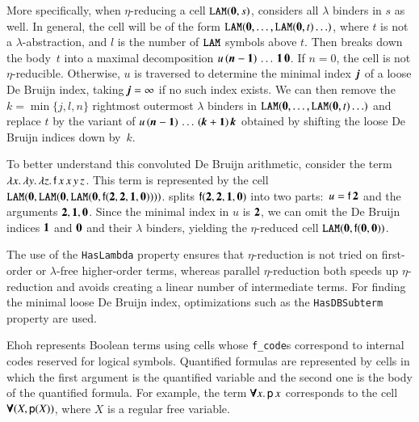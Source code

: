 More specifically, when $\eta$-reducing a cell $\texttt{LAM}(\mathbf{0}, s)$,
\ehohii{} considers all $\lambda$ binders in $s$ as well. In general,
the cell will be of the form
$\texttt{LAM}(\mathbf{0}, \dotsc,\allowbreak \texttt{LAM}(\mathbf{0}, t) \ldots)$,
where $t$ is not a
$\lambda$-abstraction, and $l$ is the number of $\texttt{LAM}$ symbols above $t$. Then \ehohii{} breaks down the body~$t$ into a maximal
decomposition $u\, (\textbf{\textit{n}}\mathbf{{}-1}) \, \ldots \, \mathbf{1} \, \mathbf{0}$.
If $n = 0$, the cell is not $\eta$-reducible.
Otherwise, $u$ is traversed to determine the
minimal index~$\textbf{\textit{j}}$ of a loose De Bruijn index,
taking $\textbf{\textit{j}} = \infty$ if no such index exists.
We can then remove the $k = \min\{j,l,n\}$ rightmost outermost $\lambda$ binders in $\texttt{LAM}(\mathbf{0},
\ldots, \texttt{LAM}(\mathbf{0}, t) \ldots)$ and replace %
$t$ by the variant of
$u \allowbreak\, (\textbf{\textit{n}}\mathbf{{}-1}) \allowbreak\, \ldots \, (\textbf{\textit{k}}\mathbf{{}+1}) \, \textbf{\textit{k}}$
obtained by shifting the loose De Bruijn indices down by~$k$.

To better understand this convoluted De Bruijn arithmetic, consider the
term $\lambda x. \, \lambda y. \, \lambda z.\,\allowbreak \mathsf{f} \, x \, x \, y
\, z$. This term is represented by the cell $\texttt{LAM}(\mathbf{0},
\texttt{LAM}(\mathbf{0}, \texttt{LAM}(\mathbf{0},\allowbreak \mathsf{f}(\mathbf{2}, \mathbf{2}, \mathbf{1},
\mathbf{0}))))$. \ehohii{} splits $\mathsf{f}(\mathbf{2}, \mathbf{2}, \mathbf{1}, \mathbf{0})$ into
two parts:\ $u = \mathsf{f} \, \mathbf{2}$ and the arguments $\mathbf{2}, \mathbf{1},
\mathbf{0}$. Since the minimal index in $u$ is $\mathbf{2}$, we can
omit the De Bruijn indices $\mathbf{1}$ and $\mathbf{0}$ and their $\lambda$ binders,
yielding the $\eta$-reduced cell $\texttt{LAM}(\mathbf{0}, \mathsf{f}(\mathbf{0},
\mathbf{0}))$.

The use of the \texttt{HasLambda} property ensures that $\eta$-reduction is not
tried on first-order or $\lambda$-free higher-order terms, whereas parallel
$\eta$-reduction both speeds up $\eta$-reduction and avoids creating a linear
number of intermediate terms. For finding the minimal loose De Bruijn index,
optimizations such as the \texttt{HasDBSub\-term} property are used.

Ehoh represents Boolean terms using
cells whose \texttt{f\_code}s correspond to internal codes reserved
for logical symbols. Quantified formulas are represented by cells in which the
first argument is the quantified variable and the second one is the body of the
quantified formula. For example, the term $\pmb{\forall} x.\, \mathsf{p} \, x$ corresponds
to the cell $\pmb{\forall}(X, \mathsf{p}(X))$, where $X$ is a regular free variable.

